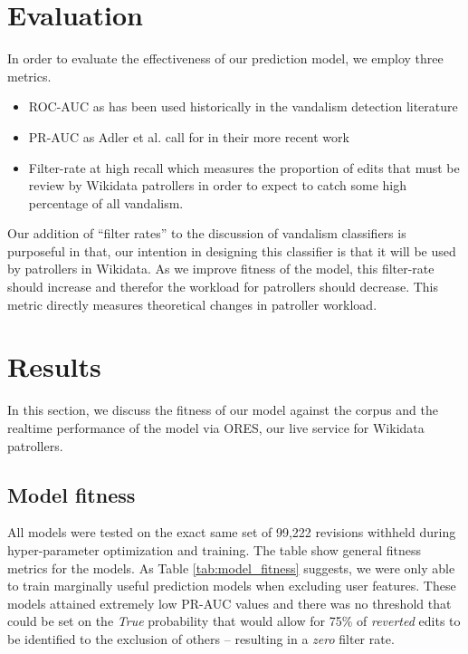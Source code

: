 \documentclass{sig-alternate}
\begin{document}
\section{Evaluation}
In order to evaluate the effectiveness of our prediction model, we employ three metrics.
\begin{itemize}
\item ROC-AUC as has been used historically in the vandalism detection literature\cite{adler:detecting, wang:got}
\item PR-AUC as Adler et al. call for in their more recent work\cite{adler:wikipedia}
\item Filter-rate at high recall which measures the proportion of edits that must be review by Wikidata patrollers in order to expect to catch some high percentage of all vandalism.
\end{itemize}

Our addition of ``filter rates'' to the discussion of vandalism classifiers is purposeful in that, our intention in designing this classifier is that it will be used by patrollers in Wikidata.  As we improve fitness of the model, this filter-rate should increase and therefor the workload for patrollers should decrease.  This metric directly measures theoretical changes in patroller workload.
\section{Results}
In this section, we discuss the fitness of our model against the corpus and the realtime performance of the model via ORES, our live service for Wikidata patrollers.
\subsection{Model fitness}
All models were tested on the exact same set of 99,222 revisions withheld during hyper-parameter optimization and training.  The table show general fitness metrics for the models.  As Table \ref{tab:model_fitness} suggests, we were only able to train marginally useful prediction models when excluding user features.  These models attained extremely low PR-AUC values and there was no threshold that could be set on the \textit{True} probability that would allow for 75\% of \textit{reverted} edits to be identified to the exclusion of others -- resulting in a \textit{zero} filter rate.
\end{document}
